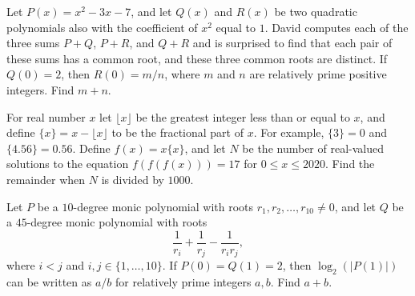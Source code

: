 \documentclass[11pt]{article}
\theoremstyle{definition}
\begin{document}
\begin{question}[name={2020 AIME II, \href{https://artofproblemsolving.com/community/c4p15681035}{Problem 11}}]
	Let $P(x) = x^2 - 3x - 7$, and let $Q(x)$ and $R(x)$ be two quadratic polynomials also with the coefficient of $x^2$ equal to $1$. David computes each of the three sums $P + Q$, $P + R$, and $Q + R$ and is surprised to find that each pair of these sums has a common root, and these three common roots are distinct. If $Q(0) = 2$, then $R(0) = m/n$, where $m$ and $n$ are relatively prime positive integers. Find $m+n$.
\end{question}


%	











\begin{question}[name={2020 AIME II, \href{https://artofproblemsolving.com/community/c4p15680959}{Problem 14}}]
	For real number $x$ let $\lfloor x\rfloor$ be the greatest integer less than or equal to $x$, and define $\{x\}=x-\lfloor x\rfloor$ to be the fractional part of $x$. For example, $\{3\}=0$ and $\{4.56\}=0.56$. Define $f(x)=x\{x\}$, and let $N$ be the number of real-valued solutions to the equation $f(f(f(x)))=17$ for $0\leq x\leq 2020$. Find the remainder when $N$ is divided by $1000$.
\end{question}


%	



\begin{question}[name={2020 PUMaC, Algebra, \href{https://artofproblemsolving.com/community/c4p23985023}{Problem A4/B6}}]
	Let $P$ be a $10$-degree monic polynomial with roots $r_1, r_2, \dots , r_{10} \neq 0$, and let $Q$ be a $45$-degree monic polynomial with roots $$\frac{1}{r_i}+\frac{1}{r_j}-\frac{1}{r_ir_j},$$ where $i < j$ and $i, j \in \{1, \dots , 10\}$. If $P(0) = Q(1) = 2$, then $\log_2 (|P(1)|)$ can be written as $a/b$ for relatively prime integers $a, b$. Find $a + b$.	
\end{question}


%	
\end{document}
